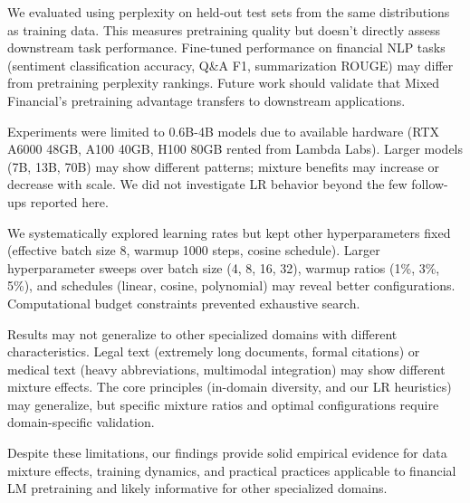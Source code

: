 We evaluated using perplexity on held-out test sets from the same distributions as training data. This measures pretraining quality but doesn't directly assess downstream task performance. Fine-tuned performance on financial NLP tasks (sentiment classification accuracy, Q\&A F1, summarization ROUGE) may differ from pretraining perplexity rankings. Future work should validate that Mixed Financial's pretraining advantage transfers to downstream applications.

Experiments were limited to 0.6B-4B models due to available hardware (RTX A6000 48GB, A100 40GB, H100 80GB rented from Lambda Labs). Larger models (7B, 13B, 70B) may show different patterns; mixture benefits may increase or decrease with scale. We did not investigate LR behavior beyond the few follow-ups reported here.

We systematically explored learning rates but kept other hyperparameters fixed (effective batch size 8, warmup 1000 steps, cosine schedule). Larger hyperparameter sweeps over batch size (4, 8, 16, 32), warmup ratios (1\%, 3\%, 5\%), and schedules (linear, cosine, polynomial) may reveal better configurations. Computational budget constraints prevented exhaustive search.

Results may not generalize to other specialized domains with different characteristics. Legal text (extremely long documents, formal citations) or medical text (heavy abbreviations, multimodal integration) may show different mixture effects. The core principles (in-domain diversity, and our LR heuristics) may generalize, but specific mixture ratios and optimal configurations require domain-specific validation.

Despite these limitations, our findings provide solid empirical evidence for data mixture effects, training dynamics, and practical practices applicable to financial LM pretraining and likely informative for other specialized domains.
